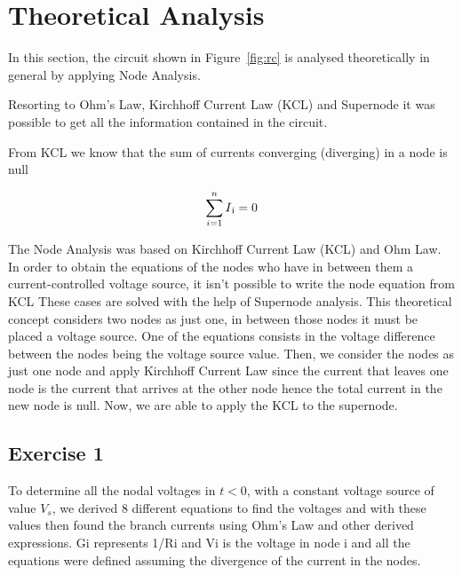 \section{Theoretical Analysis}
\label{sec:analysis}

In this section, the circuit shown in Figure~\ref{fig:rc} is analysed
theoretically in general by applying Node Analysis. 

Resorting to Ohm's Law, Kirchhoff Current Law (KCL) and Supernode it was possible to get all the information contained in the circuit. 

From KCL we know that the sum of currents converging (diverging) in
a node is null

\[ \sum_{i=1}^{n} I\textsubscript{i} = 0 \]


The Node Analysis was based on Kirchhoff Current Law (KCL) and Ohm Law.
In order to obtain the equations of the nodes who have in between them  a current-controlled voltage source, it isn't possible to write the node equation from KCL
These cases are solved with the help of Supernode analysis. This theoretical concept considers two nodes as just one, in between those nodes it must be placed a voltage source. One of the equations consists in the voltage difference between the nodes being the voltage source value. Then, we consider the nodes as just one node and apply Kirchhoff Current Law since the current that leaves one node is the current that arrives at the other node hence the total current in the new node is null. Now, we are able to apply the KCL to the supernode. 


\subsection{Exercise 1}
To determine all the nodal voltages in $t<0$, with a constant voltage source of value $V_s$, we derived 8 different equations to find the voltages and with these
values then found the branch currents using Ohm's Law and other derived expressions. 
Gi represents 1/Ri and Vi is the voltage in node i and all the equations were defined assuming the divergence of the current in the nodes.

